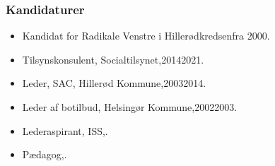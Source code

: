 \documentclass[11pt, a4paper]{awesome-cv}
\begin{document}
\begin{cvletter}
\subsubsection*{Kandidaturer}
\begin{itemize}
\item Kandidat for Radikale Venstre i Hillerødkredsenfra 2000.
\end{itemize}
\begin{itemize}
\item Tilsynskonsulent, Socialtilsynet,20142021.
\item Leder, SAC, Hillerød Kommune,20032014.
\item Leder af botilbud, Helsingør Kommune,20022003.
\item Lederaspirant, ISS,.
\item Pædagog,.
\end{itemize}
\end{cvletter}
\end{document}
